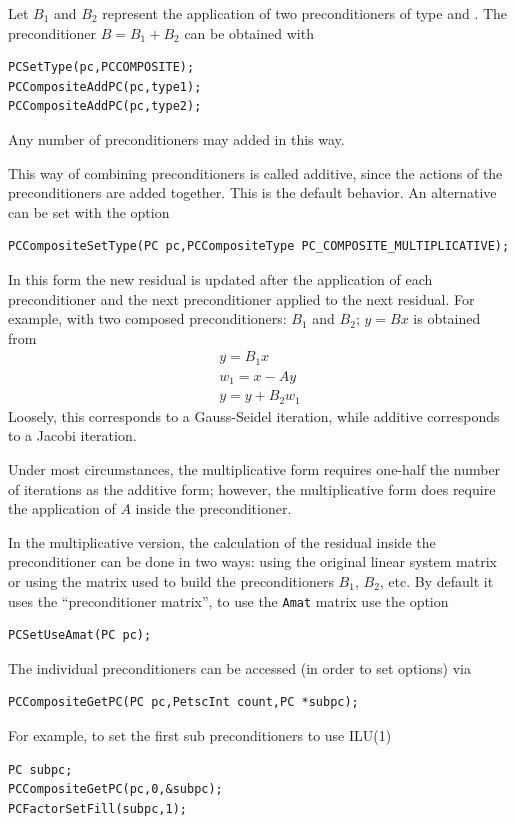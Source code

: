 Let $B_1$ and $B_2$ represent the application of two
preconditioners of type  and . The preconditioner
$ B = B_1 + B_2 $ can be obtained with
\begin{lstlisting}
PCSetType(pc,PCCOMPOSITE);
PCCompositeAddPC(pc,type1);
PCCompositeAddPC(pc,type2);
\end{lstlisting}
Any number of preconditioners may added in this way.

This way of combining preconditioners is called additive, since
the actions of the preconditioners are added together. This is the
default behavior. An alternative can be set with the option
\begin{lstlisting}
PCCompositeSetType(PC pc,PCCompositeType PC_COMPOSITE_MULTIPLICATIVE);
\end{lstlisting}
 
In this form the new residual is updated after the application of
each preconditioner and the next preconditioner applied to the next
residual. For example, with two composed preconditioners: $B_1$ and
$ B_2$; $ y = B x $ is obtained from
\begin{eqnarray*}
y    = B_1 x \\
w_1  = x - A y \\
y    = y + B_2 w_1
\end{eqnarray*}
Loosely, this corresponds to a Gauss-Seidel iteration, while
additive corresponds to a Jacobi iteration.

Under most circumstances, the multiplicative form requires one-half the number of
iterations as the additive form; however, the multiplicative form does require
the application of $ A $ inside the preconditioner.

In the multiplicative version, the calculation of the residual inside the
preconditioner can be done in two ways: using the original linear system matrix
or using the matrix used to build the preconditioners $B_1$, $B_2$, etc.
By default it uses the ``preconditioner matrix'', to use the \lstinline{Amat} matrix use the
option
\begin{lstlisting}
PCSetUseAmat(PC pc);
\end{lstlisting}

The individual
preconditioners can be accessed (in order to set options) via
\begin{lstlisting}
PCCompositeGetPC(PC pc,PetscInt count,PC *subpc);
\end{lstlisting}
For example, to set the first sub preconditioners to use ILU(1)
\begin{lstlisting}
PC subpc;
PCCompositeGetPC(pc,0,&subpc);
PCFactorSetFill(subpc,1);
\end{lstlisting}

